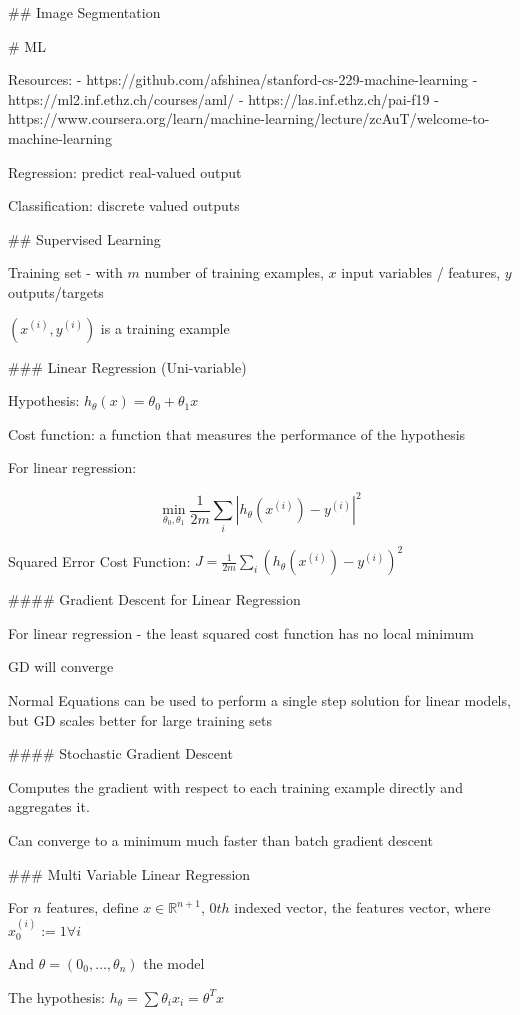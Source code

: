 ## Image Segmentation



# ML

Resources:
- https://github.com/afshinea/stanford-cs-229-machine-learning
- https://ml2.inf.ethz.ch/courses/aml/
- https://las.inf.ethz.ch/pai-f19
- https://www.coursera.org/learn/machine-learning/lecture/zcAuT/welcome-to-machine-learning

Regression: predict real-valued output

Classification: discrete valued outputs

## Supervised Learning

Training set - with $m$ number of training examples, $x$ input variables / features, $y$ outputs/targets

$(x^{(i)},y^{(i)})$ is a training example

### Linear Regression (Uni-variable)

Hypothesis: $h_\theta(x) = \theta_0 + \theta_1x$ 

Cost function: a function that measures the performance of the hypothesis

For linear regression: 

$$\min_{\theta_0,\theta_1} \frac{1}{2m}\sum_i| h_\theta(x^{(i)})-y^{(i)} |^2 $$

Squared Error Cost Function: $J = \frac{1}{2m}\sum_i( h_\theta(x^{(i)})-y^{(i)} )^2 $ 

#### Gradient Descent for Linear Regression

For linear regression - the least squared cost function has no local minimum

GD will converge 

Normal Equations can be used to perform a single step solution for linear models, but GD scales better for large training sets

#### Stochastic Gradient Descent

Computes the gradient with respect to each training example directly and aggregates it. 

Can  converge to a minimum much faster than batch gradient descent 

### Multi Variable Linear Regression

For $n$ features, define $ x\in\mathbb{R}^{n+1}$, $0th$ indexed vector,  the features vector, where $x_0^{(i)} := 1 \forall i$  

And $\theta = (0_0,\dots,\theta_n)$  the model

The hypothesis: $h_{\theta} = \sum \theta_i x_i = \theta^T x$  

